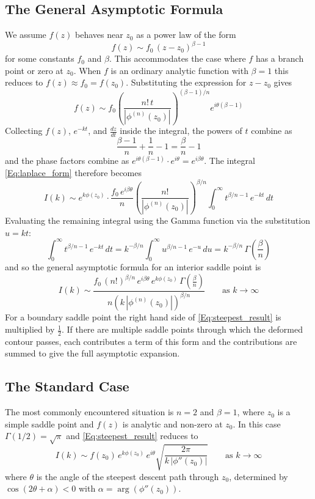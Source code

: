 \subsection{The General Asymptotic Formula}

We assume $f(z)$ behaves near $z_0$ as a power law of the form$$f(z) \sim f_0\,(z - z_0)^{\beta - 1}$$for some constants $f_0$ and $\beta$. This accommodates the case where $f$ has a branch point or zero at $z_0$. When $f$ is an ordinary analytic function with $\beta = 1$ this reduces to $f(z) \approx f_0 = f(z_0)$. Substituting the expression for $z - z_0$ gives $$f(z) \sim f_0\left(\frac{n!\,t}{|\phi^{(n)}(z_0)|}\right)^{(\beta-1)/n} e^{i\theta(\beta-1)}$$Collecting $f(z)$, $e^{-kt}$, and $\frac{dz}{dt}$ inside the integral, the powers of $t$ combine as $$\frac{\beta - 1}{n} + \frac{1}{n} - 1 = \frac{\beta}{n} - 1$$ and the phase factors combine as $e^{i\theta(\beta-1)}\cdot e^{i\theta} = e^{i\beta\theta}$. The integral \eqref{Eq:laplace_form} therefore becomes $$I(k) \sim e^{k\phi(z_0)}\cdot\frac{f_0\,e^{i\beta\theta}}{n}\left(\frac{n!}{|\phi^{(n)}(z_0)|}\right)^{\beta/n}\int_0^\infty t^{\beta/n - 1}\,e^{-kt}\,dt$$
Evaluating the remaining integral using the Gamma function via the substitution $u = kt$:$$\int_0^\infty t^{\beta/n - 1}\,e^{-kt}\,dt = k^{-\beta/n}\int_0^\infty u^{\beta/n - 1}\,e^{-u}\,du = k^{-\beta/n}\,\Gamma\!\left(\frac{\beta}{n}\right)$$and so the general asymptotic formula for an interior saddle point is
\begin{equation}\label{Eq:steepest_result}
    I(k) \sim \frac{f_0\,(n!)^{\beta/n}\,e^{i\beta\theta}\,e^{k\phi(z_0)}\,
    \Gamma\!\left(\frac{\beta}{n}\right)}{n\left(k\,|\phi^{(n)}(z_0)|\right)^{\beta/n}}
    \qquad \text{as } k \to \infty
\end{equation}
For a boundary saddle point the right hand side of \eqref{Eq:steepest_result} 
is multiplied by $\frac{1}{2}$. If there are multiple saddle points through 
which the deformed contour passes, each contributes a term of this form and the 
contributions are summed to give the full asymptotic expansion. \cite{RedBook,Asymptotic, Steepestdescent,Steepestorigin}

\subsection{The Standard Case}

The most commonly encountered situation is $n = 2$ and $\beta = 1$, where $z_0$ 
is a simple saddle point and $f(z)$ is analytic and non-zero at $z_0$. In this 
case $\Gamma(1/2) = \sqrt{\pi}$ and \eqref{Eq:steepest_result} reduces to
\begin{equation}\label{Eq:steepest_standard}
    I(k) \sim f(z_0)\,e^{k\phi(z_0)}\,e^{i\theta}
    \sqrt{\frac{2\pi}{k\,|\phi''(z_0)|}}
    \qquad \text{as } k \to \infty
\end{equation}
where $\theta$ is the angle of the steepest descent path through $z_0$, 
determined by $\cos(2\theta + \alpha) < 0$ with $\alpha = \arg(\phi''(z_0))$.


